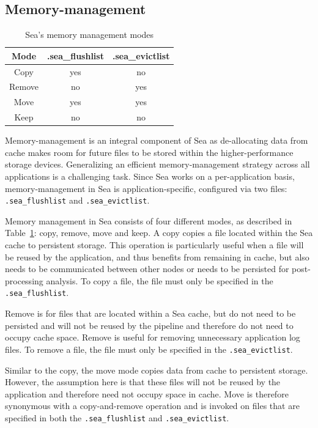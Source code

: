 \documentclass[10pt,journal,compsoc]{IEEEtran}
\newcommand{\todo}[1]{\marginpar{\parbox{18mm}{\flushleft\tiny\color{red}\textbf{TODO}:
#1}}}
\begin{document}
\subsection{Memory-management}
      \begin{table}
      \centering
      \begin{tabular}{ccc}
        \toprule
       Mode & .sea\_flushlist & .sea\_evictlist \\
       \midrule
       Copy & yes & no \\
       Remove & no & yes \\
       Move & yes & yes \\
       Keep & no & no \\

       \bottomrule

      \end{tabular}
      \caption{Sea's memory management modes}
      \label{table:sea-comp:fe}
      \end{table}
Memory-management is an integral component of Sea as de-allocating data from cache
makes room for future files to be stored within the higher-performance storage devices.
Generalizing an efficient memory-management strategy across all applications is a challenging task.
Since Sea works on a per-application basis, memory-management in Sea is application-specific, configured
via two files: \texttt{.sea\_flushlist} and \texttt{.sea\_evictlist}.

Memory management in Sea consists of four different modes, as described in Table~\ref{table:sea-comp:fe}: copy,
remove, move and keep. A copy copies a file located within the Sea cache to
persistent storage. This operation is particularly useful when a file will be
reused by the application, and thus benefits from remaining in cache, but also
needs to be communicated between other nodes or needs to be persisted for
post-processing analysis. To copy a file, the file must only be specified
in the \texttt{.sea\_flushlist}.

Remove is for files that are
located within a Sea cache, but do not need to be persisted and will not be
reused by the pipeline and therefore do not need to occupy cache space.
Remove is useful for removing unnecessary application log files. To
remove a file, the file must only be specified in the
\texttt{.sea\_evictlist}.

Similar to the copy, the move mode copies data from cache to
persistent storage. However, the assumption here is that these files will not be
reused by the application and therefore need not occupy space in cache.
Move is therefore synonymous with a copy-and-remove operation and is invoked on
files that are specified in both the \texttt{.sea\_flushlist} and
\texttt{.sea\_evictlist}.
\end{document}
